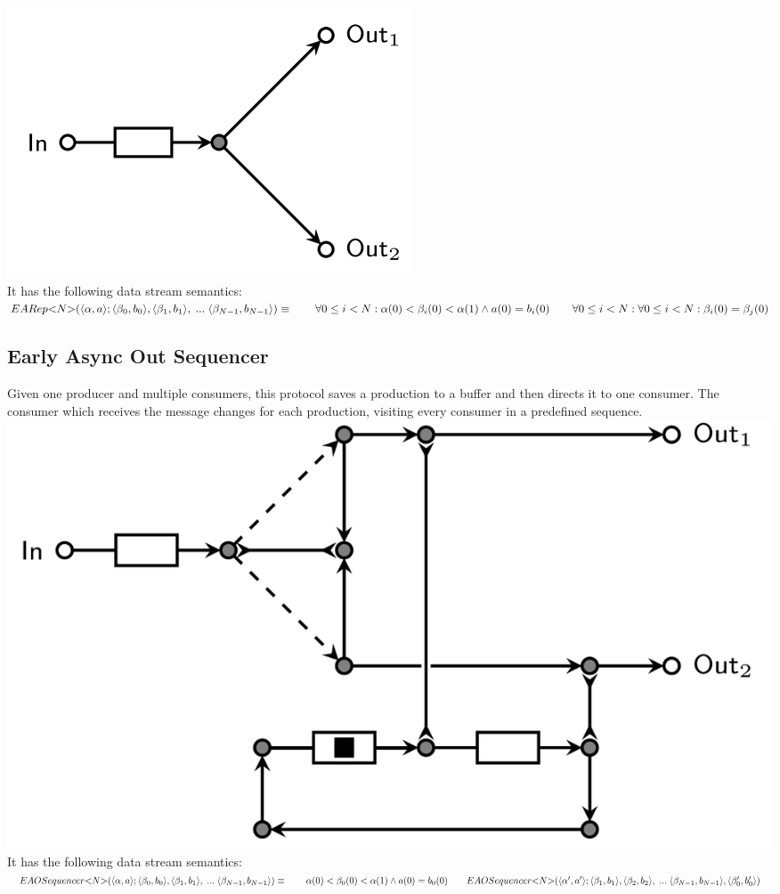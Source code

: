 \includegraphics[]{img/EARep.png}\\
%
It has the following data stream semantics:\\
%
$
EARep{<}N{>}(\langle \alpha, a \rangle ; \langle \beta_0, b_0 \rangle, \langle \beta_1, b_1 \rangle,\; ... \; \langle \beta_{N-1}, b_{N-1} \rangle) \equiv \\
\hphantom \qquad \forall 0 \leq i < N : \alpha(0) < \beta_i(0) < \alpha(1) \land a(0) = b_i(0) \\
\hphantom \qquad\forall 0 \leq i < N : \forall 0 \leq i < N : \beta_i(0) = \beta_j(0)
$\\

\subsection{Early Async Out Sequencer}
Given one producer and multiple consumers, this protocol saves a production to a buffer and then directs it to one consumer. The consumer which receives the message changes for each production, visiting every consumer in a predefined sequence.\\

\includegraphics[]{img/EAOSeq.png}\\
%
It has the following data stream semantics:\\
%
$
EAOSequencer{<}N{>}(\langle \alpha, a \rangle;\langle \beta_0, b_0 \rangle, \langle \beta_1, b_1 \rangle,\;...\; \langle \beta_{N-1}, b_{N-1} \rangle) \equiv \\
\hphantom \qquad \alpha(0) < \beta_0(0) < \alpha(1) \land a(0) = b_0(0) \\
\hphantom \qquad EAOSequencer{<}N{>}(\langle \alpha', a' \rangle; \langle \beta_1, b_1 \rangle,\langle \beta_2, b_2 \rangle,\;...\; \langle \beta_{N-1}, b_{N-1} \rangle, \langle \beta_0', b_0' \rangle)
$
